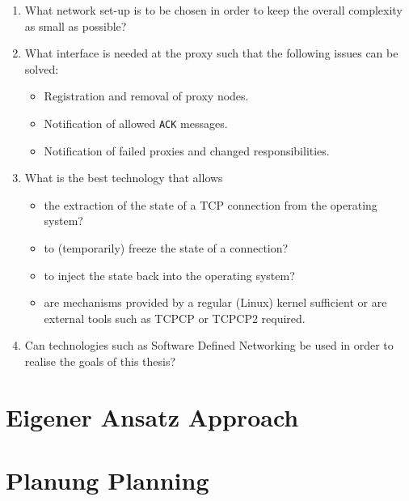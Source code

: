 \documentclass[10pt,a4paper,oneside]{scrartcl}
\newcommand\hint[2]{
\ifthenelse{\boolean{showhints}}{
\begin{center}
\colorbox{black!10}{
\begin{minipage}{.963\textwidth}
#2\hfill\textbf{#1}
\end{minipage}
}\end{center}}{}
}
\begin{document}
\begin{enumerate}
 \item What network set-up is to be chosen in order to keep the overall complexity as small as
	 possible?
 \item What interface is needed at the proxy such that the following issues can be solved:
  \begin{itemize}
	\item Registration and removal of proxy nodes.
	\item Notification of allowed \texttt{ACK} messages.
	\item Notification of failed proxies and changed responsibilities.
  \end{itemize}
 \item What is the best technology that allows 
  \begin{itemize}
	\item the extraction of the state of a TCP connection from the operating system?
	\item to (temporarily) freeze the state of a connection?
	\item to inject the state back into the operating system?
	\item are mechanisms provided by a regular (Linux) kernel sufficient or are external tools
		such as TCPCP or TCPCP2 required.
  \end{itemize}
 \item Can technologies such as Software Defined Networking be used in order to realise the goals
	 of this thesis?
\end{enumerate}

\section{
	{Eigener Ansatz}
	{Approach}}
\label{sec:approach}




\section{
	{Planung}
	{Planning}}
\label{sec:planning}
\end{document}
